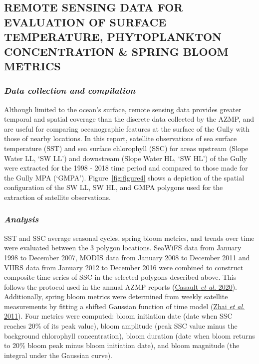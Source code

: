 \documentclass[12pt]{article}\usepackage[]{graphicx}\usepackage[]{color}
\begin{document}
\hypertarget{remote-sensing-data-for-evaluation-of-surface-temperature-phytoplankton-concentration-spring-bloom-metrics}{%
\subsection{\texorpdfstring{\textbf{REMOTE SENSING DATA FOR EVALUATION OF SURFACE TEMPERATURE, PHYTOPLANKTON CONCENTRATION \& SPRING BLOOM METRICS}}{REMOTE SENSING DATA FOR EVALUATION OF SURFACE TEMPERATURE, PHYTOPLANKTON CONCENTRATION \& SPRING BLOOM METRICS}}\label{remote-sensing-data-for-evaluation-of-surface-temperature-phytoplankton-concentration-spring-bloom-metrics}}

\hypertarget{data-collection-and-compilation-3}{%
\subsubsection{\texorpdfstring{\emph{Data collection and compilation}}{Data collection and compilation}}\label{data-collection-and-compilation-3}}

Although limited to the ocean's surface, remote sensing data provides greater temporal and spatial coverage than the discrete data collected by the AZMP, and are useful for comparing oceanographic features at the surface of the Gully with those of nearby locations. In this report, satellite observations of sea surface temperature (SST) and sea surface chlorophyll (SSC) for areas upstream (Slope Water LL, `SW LL') and downstream (Slope Water HL, `SW HL') of the Gully were extracted for the 1998 - 2018 time period and compared to those made for the Gully MPA (`GMPA'). Figure~\ref{fig:figure4} shows a depiction of the spatial configuration of the SW LL, SW HL, and GMPA polygons used for the extraction of satellite observations.

\hypertarget{analysis-3}{%
\subsubsection{\texorpdfstring{\emph{Analysis}}{Analysis}}\label{analysis-3}}

SST and SSC average seasonal cycles, spring bloom metrics, and trends over time were evaluated between the 3 polygon locations. SeaWiFS data from January 1998 to December 2007, MODIS data from January 2008 to December 2011 and VIIRS data from January 2012 to December 2016 were combined to construct composite time series of SSC in the selected polygons described above. This follows the protocol used in the annual AZMP reports (\protect\hyperlink{ref-casault_2020}{Casault \textit{et al.} 2020}). Additionally, spring bloom metrics were determined from weekly satellite measurements by fitting a shifted Gaussian function of time model (\protect\hyperlink{ref-zhai_2011}{Zhai \textit{et al.} 2011}). Four metrics were computed: bloom initiation date (date when SSC reaches 20\% of its peak value), bloom amplitude (peak SSC value minus the background chlorophyll concentration), bloom duration (date when bloom returns to 20\% bloom peak minus bloom initiation date), and bloom magnitude (the integral under the Gaussian curve).
\end{document}
